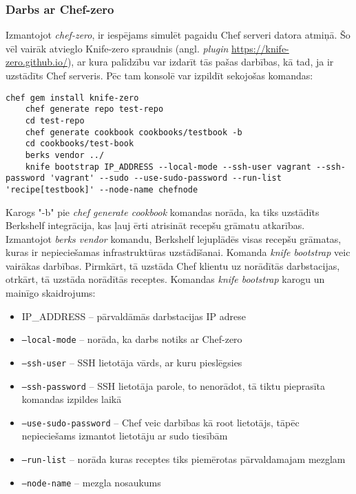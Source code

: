 \subsubsection{Darbs ar Chef-zero}
Izmantojot \textit{chef-zero}, ir iespējams simulēt pagaidu Chef serveri datora atmiņā. Šo vēl vairāk atvieglo Knife-zero spraudnis (angl. \textit{plugin} \url{https://knife-zero.github.io/}), ar kura palīdzību var izdarīt tās pašas darbības, kā tad, ja ir uzstādīts Chef serveris.
Pēc tam konsolē var izpildīt sekojošas komandas:
\begin{lstlisting}[frame=single]
	chef gem install knife-zero
	chef generate repo test-repo
	cd test-repo
	chef generate cookbook cookbooks/testbook -b
	cd cookbooks/test-book
	berks vendor ../
	knife bootstrap IP_ADDRESS --local-mode --ssh-user vagrant --ssh-password 'vagrant' --sudo --use-sudo-password --run-list 'recipe[testbook]' --node-name chefnode
\end{lstlisting}
Karogs "-b" pie \textit{chef generate cookbook} komandas norāda, ka tiks uzstādīts Berkshelf integrācija, kas ļauj ērti atrisināt recepšu grāmatu atkarības.
Izmantojot \textit{berks vendor} komandu, Berkshelf lejuplādēs visas recepšu grāmatas, kuras ir nepieciešamas infrastruktūras uzstādīšanai.
Komanda \textit{knife bootstrap} veic vairākas darbības. Pirmkārt, tā uzstāda Chef klientu uz norādītās darbstacijas, otrkārt, tā uzstāda norādītās receptes.
Komandas \textit{knife bootstrap} karogu un mainīgo skaidrojums:
\begin{itemize}
	\item IP_ADDRESS -- pārvaldāmās darbstacijas IP adrese
	\item \texttt{--local-mode} -- norāda, ka darbs notiks ar Chef-zero
	\item \texttt{--ssh-user} -- SSH lietotāja vārds, ar kuru pieslēgsies
	\item \texttt{--ssh-password} -- SSH lietotāja parole, to nenorādot, tā tiktu pieprasīta komandas izpildes laikā
	\item \texttt{--use-sudo-password} -- Chef veic darbības kā root lietotājs, tāpēc nepieciešams izmantot lietotāju ar sudo tiesībām
	\item \texttt{--run-list} -- norāda kuras receptes tiks piemērotas pārvaldamajam mezglam
	\item \texttt{--node-name} -- mezgla nosaukums
\end{itemize}

